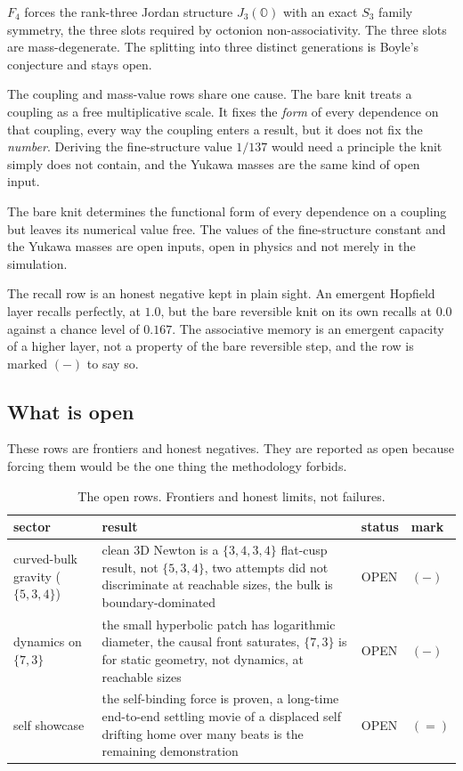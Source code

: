 \begin{proposition}
$F_4$ forces the rank-three Jordan structure $J_3(\mathbb{O})$ with an exact $S_3$ family symmetry, the three slots required by octonion non-associativity. The three slots are mass-degenerate. The splitting into three distinct generations is Boyle's conjecture and stays open.
\end{proposition}

The coupling and mass-value rows share one cause. The bare knit treats a coupling as a free multiplicative scale. It fixes the \emph{form} of every dependence on that coupling, every way the coupling enters a result, but it does not fix the \emph{number}. Deriving the fine-structure value $1/137$ would need a principle the knit simply does not contain, and the Yukawa masses are the same kind of open input.

\begin{result}
The bare knit determines the functional form of every dependence on a coupling but leaves its numerical value free. The values of the fine-structure constant and the Yukawa masses are open inputs, open in physics and not merely in the simulation.
\end{result}

The recall row is an honest negative kept in plain sight. An emergent Hopfield layer recalls perfectly, at $1.0$, but the bare reversible knit on its own recalls at $0.0$ against a chance level of $0.167$. The associative memory is an emergent capacity of a higher layer, not a property of the bare reversible step, and the row is marked $(-)$ to say so.

\subsection{What is open}

These rows are frontiers and honest negatives. They are reported as open because forcing them would be the one thing the methodology forbids.

\begin{table}[ht]
\centering
\small
\begin{tabular}{@{}p{3.2cm}p{8.0cm}ll@{}}
\toprule
sector & result & status & mark \\
\midrule
curved-bulk gravity ($\{5,3,4\}$) & clean 3D Newton is a $\{3,4,3,4\}$ flat-cusp result, not $\{5,3,4\}$, two attempts did not discriminate at reachable sizes, the bulk is boundary-dominated & OPEN & $(-)$ \\
dynamics on $\{7,3\}$ & the small hyperbolic patch has logarithmic diameter, the causal front saturates, $\{7,3\}$ is for static geometry, not dynamics, at reachable sizes & OPEN & $(-)$ \\
self showcase & the self-binding force is proven, a long-time end-to-end settling movie of a displaced self drifting home over many beats is the remaining demonstration & OPEN & $(=)$ \\
\bottomrule
\end{tabular}
\caption{The open rows. Frontiers and honest limits, not failures.}
\label{tab:open}
\end{table}

